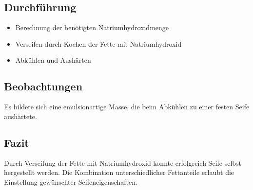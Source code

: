 \documentclass{article}
\begin{document}
    \subsection{Durchführung}
    \begin{itemize}
        \item Berechnung der benötigten Natriumhydroxidmenge
        \item Verseifen durch Kochen der Fette mit Natriumhydroxid
        \item Abkühlen und Aushärten
    \end{itemize}

    \subsection{Beobachtungen}
    Es bildete sich eine emulsionartige Masse, die beim Abkühlen zu einer festen Seife aushärtete.

    \subsection{Fazit}
    Durch Verseifung der Fette mit Natriumhydroxid konnte erfolgreich Seife selbst hergestellt werden. Die Kombination unterschiedlicher Fettanteile erlaubt die Einstellung gewünschter Seifeneigenschaften.
\end{document}
